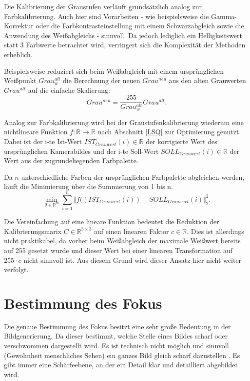 {Die Kalibrierung der Graustufen verläuft grundsätzlich analog zur Farbkalibrierung.
Auch hier sind Vorarbeiten - wie beispielsweise die Gamma-Korrektur oder 
die Farbkontrasteinstellung mit einem Schwarzabgleich sowie die Anwendung des Weißabgleichs - sinnvoll. 
Da jedoch lediglich ein Helligkeitswert statt 3 Farbwerte betrachtet wird,
verringert sich die Komplexität der Methoden erheblich.

Beispielsweise reduziert sich beim Weißabgleich mit einem ursprünglichen Weißpunkt $Grau_w^{alt}$ 
die Berechnung der neuen $Grau^{neu}$
aus den alten Grauwerten $Grau^{alt}$ auf die einfache Skalierung:
\[
Grau^{neu}=\frac{255}{Grau_w^{alt}} Grau^{alt}.
\]

Analog zur Farbkalibrierung wird bei der Graustufenkalibrierung \linebreak 
wiederum eine nichtlineare Funktion 
$f:\mathbb{R} \rightarrow  \mathbb{R}$ nach Abschnitt \ref{LSQ} zur Optimierung genutzt.
Dabei ist der i-te Ist-Wert $ IST_{Grauwert}(i) \in \mathbb{R}$ 
der korrigierte Wert des ursprünglichen Kamerabildes 
und der i-te Soll-Wert $ SOLL_{Grauwert}(i) \in \mathbb{R}$ der Wert 
aus der zugrundeliegenden Farbpalette.

Da $n$ unterschiedliche Farben der ursprünglichen Farbpalette abgleichen werden, 
läuft die Minimierung über die Summierung von 1 bis n.
\[
\min_{\theta\in \mathbb{R}^m}  \sum_{i=1}^n \Vert f( (IST_{Grauwert}(i)) - SOLL_{Grauwert}(i) \Vert_2^2.
\]

Die Vereinfachung auf eine lineare Funktion bedeutet die Reduktion der Kalibrierungsmarix 
$C \in \mathbb{R}^{3 \times 3}$ auf einen linearen Faktor $c\in \mathbb{R}$.
Dies ist allerdings nicht praktikabel,
da vorher beim Weißabgleich der maximale Weißwert bereits auf 255 gesetzt wurde
und dieser Wert bei einer linearen Transformation auf $255 \cdot c$ nicht sinnvoll ist.
Aus diesem Grund wird dieser Ansatz hier nicht weiter verfolgt.



\chapter{Bestimmung des Fokus}

Die genaue Bestimmung des Fokus besitzt eine sehr große Bedeutung in der Bildgenerierung. 
Da dieser bestimmt, welche Stelle eines Bildes scharf oder verschwommen dargestellt wird. 
Es ist technisch nicht möglich und sinnvoll (Gewohnheit menschliches Sehen) ein ganzes Bild 
gleich scharf dazustellen \cite[S. 86]{Gradias:2014}. Es gibt immer eine Schärfeebene, 
an der ein Detail klar und detailliert abgebildet wird. 

}
